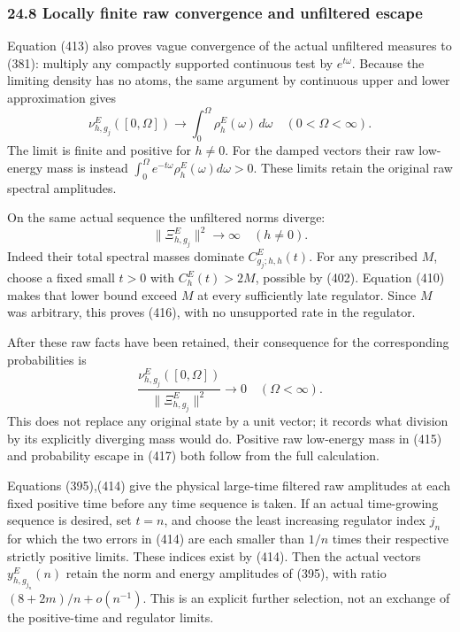 \documentclass[
  11pt,
]{article}
\begin{document}
\subsubsection{24.8 Locally finite raw convergence and unfiltered
escape}\label{locally-finite-raw-convergence-and-unfiltered-escape}

Equation (413) also proves vague convergence of the actual unfiltered
measures to (381): multiply any compactly supported continuous test by
\(e^{t\omega}\). Because the limiting density has no atoms, the same
argument by continuous upper and lower approximation gives \[
 \nu^E_{h,g_j}([0,\Omega])
 \longrightarrow\int_0^\Omega\rho^E_h(\omega)\,d\omega
 \quad(0<\Omega<\infty).
 \tag{415}
\] The limit is finite and positive for \(h\ne0\). For the damped
vectors their raw low-energy mass is instead
\(\int_0^\Omega e^{-t\omega}\rho^E_h(\omega)d\omega>0\). These limits
retain the original raw spectral amplitudes.

On the same actual sequence the unfiltered norms diverge: \[
 \boxed{\|\Xi^E_{h,g_j}\|^2\longrightarrow\infty
        \quad(h\ne0).}
 \tag{416}
\] Indeed their total spectral masses dominate \(C^E_{g_j;h,h}(t)\). For
any prescribed \(M\), choose a fixed small \(t>0\) with \(C^E_h(t)>2M\),
possible by (402). Equation (410) makes that lower bound exceed \(M\) at
every sufficiently late regulator. Since \(M\) was arbitrary, this
proves (416), with no unsupported rate in the regulator.

After these raw facts have been retained, their consequence for the
corresponding probabilities is \[
 \frac{\nu^E_{h,g_j}([0,\Omega])}
      {\|\Xi^E_{h,g_j}\|^2}\longrightarrow0
 \quad(\Omega<\infty).
 \tag{417}
\] This does not replace any original state by a unit vector; it records
what division by its explicitly diverging mass would do. Positive raw
low-energy mass in (415) and probability escape in (417) both follow
from the full calculation.

Equations (395),(414) give the physical large-time filtered raw
amplitudes at each fixed positive time before any time sequence is
taken. If an actual time-growing sequence is desired, set \(t=n\), and
choose the least increasing regulator index \(j_n\) for which the two
errors in (414) are each smaller than \(1/n\) times their respective
strictly positive limits. These indices exist by (414). Then the actual
vectors \(y^E_{h,g_{j_n}}(n)\) retain the norm and energy amplitudes of
(395), with ratio \((8+2m)/n+o(n^{-1})\). This is an explicit further
selection, not an exchange of the positive-time and regulator limits.
\end{document}
